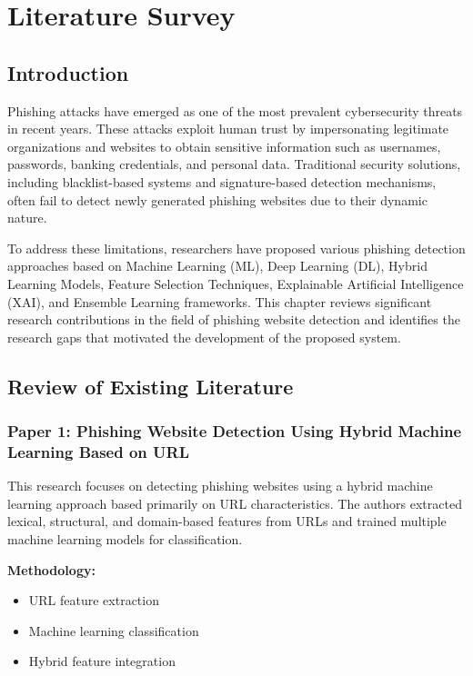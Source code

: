 \documentclass[12pt]{report}
\begin{document}
\chapter{Literature Survey}

\section{Introduction}

Phishing attacks have emerged as one of the most prevalent cybersecurity threats in recent years. These attacks exploit human trust by impersonating legitimate organizations and websites to obtain sensitive information such as usernames, passwords, banking credentials, and personal data. Traditional security solutions, including blacklist-based systems and signature-based detection mechanisms, often fail to detect newly generated phishing websites due to their dynamic nature.

To address these limitations, researchers have proposed various phishing detection approaches based on Machine Learning (ML), Deep Learning (DL), Hybrid Learning Models, Feature Selection Techniques, Explainable Artificial Intelligence (XAI), and Ensemble Learning frameworks. This chapter reviews significant research contributions in the field of phishing website detection and identifies the research gaps that motivated the development of the proposed system.

\section{Review of Existing Literature}

\subsection{Paper 1: Phishing Website Detection Using Hybrid Machine Learning Based on URL}

This research focuses on detecting phishing websites using a hybrid machine learning approach based primarily on URL characteristics. The authors extracted lexical, structural, and domain-based features from URLs and trained multiple machine learning models for classification.

\textbf{Methodology:}
\begin{itemize}
    \item URL feature extraction
    \item Machine learning classification
    \item Hybrid feature integration
\end{itemize}
\end{document}
